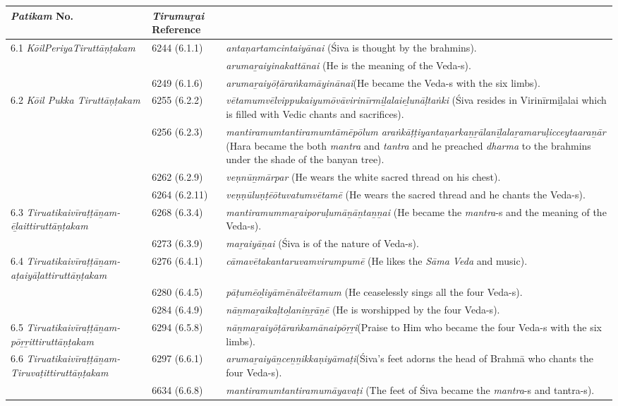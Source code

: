 \begin{longtable}{|m{2.7cm}|m{2.7cm}|>{\raggedright}m{3cm}|}
\hline
\multicolumn{1}{|m{2.5cm}}{\centering \textit{Patikam} No.} & \multicolumn{1}{|m{2.5cm}}{\centering \textit{Tirumuṟai} Reference} & \multicolumn{1}{|m{2.5cm}|}{\centering Text} \\
\hline
6.1 \textit{KōilPeriyaTiruttāṇṭakam} & 6244 (6.1.1) & \textit{antaṇartamcintaiyānai}  (Śiva is thought by the brahmins). \tabularnewline
\hline
 &  & \textit{arumaṟaiyinakattānai} (He is the meaning of the Veda-s). \tabularnewline
\hline
 & 6249 (6.1.6) & \textit{arumaṟaiyōṭāraṅkamā\-yinānai}(He became the Veda-s with the six limbs). \tabularnewline
\hline
6.2 \textit{Kōil Pukka Tiruttāṇṭakam} & 6255 (6.2.2) & \textit{vētamumvēlvippukai\-yumōvāvirinīrmiḻalai\-eḻunāḷtaṅki} (Śiva resides in Virinīrmiḻalai which is filled with Vedic chants and sacrifices). \tabularnewline
\hline
 & 6256 (6.2.3) & \textit{mantiramumtantira\-mumtāmēpōlum araṅkāṭṭiyantaṇarkaṉṟālanīḻalaṟamaruḷicceytaaraṉār} (Hara became the both \textit{mantra }and \textit{tantra} and he preached \textit{dharma} to the brahmins under the shade of the banyan tree). \tabularnewline
\hline
 & 6262 (6.2.9) & \textit{veṇnūṉmārpar} (He wears the white sacred thread on his chest). \tabularnewline
\hline
 & 6264 (6.2.11) & \textit{veṇṇūluṇṭēōtuvatum\-vētamē} (He wears the sacred thread and he chants the Veda-s). \tabularnewline
\hline
6.3 \textit{Tiruatikaivīraṭṭāṉam-ēḻaittiruttāṇṭakam} & 6268 (6.3.4) & \textit{mantiramummaṟai\-poruḷumāṉāṉtaṉṉai} (He became the \textit{mantra}-s and the meaning of the Veda-s). \tabularnewline
\hline
 & 6273 (6.3.9) & \textit{maṟaiyāṉai} (Śiva is of the nature of Veda-s). \tabularnewline
\hline
6.4 \textit{Tiruatikaivīraṭṭā\-ṉam-aṭaiyāḷatti\-ruttāṇṭakam} & 6276 (6.4.1) & \textit{cāmavētakantaruvam\-virumpumē} (He likes the \textit{Sāma Veda} and music). \tabularnewline
\hline
 & 6280 (6.4.5) & \textit{pāṭumēoḻiyāmēnālvēta\-mum} (He ceaselessly sings all the four Veda-s). \tabularnewline
\hline
 & 6284 (6.4.9) & \textit{nāṉmaṟaikaḷtoḻaniṉṟāṉē} (He is worshipped by the four Veda-s). \tabularnewline
\hline
6.5 \textit{Tiruatikaivīra\-ṭṭāṉam-pōṟṟitti\-ruttāṇṭakam} & 6294 (6.5.8) & \textit{nāṉmaṟaiyōṭāraṅkamā\-naipōṟṟi}(Praise to Him who became the four Veda-s with the six limbs). \tabularnewline
\hline
6.6 \textit{Tiruatikaivīraṭṭāṉam-Tiruvaṭittiruttāṇ\-ṭakam} & 6297 (6.6.1) & \textit{arumaṟaiyāṉceṉṉikka\-ṇiyāmaṭi}(Śiva’s feet adorns the head of Brahmā who chants the four Veda-s). \tabularnewline
\hline
 & 6634 (6.6.8) & \textit{mantiramumtantira\-mumāyavaṭi} (The feet of Śiva  became the \textit{mantra}-s and tantra-s). \tabularnewline

\end{longtable}
